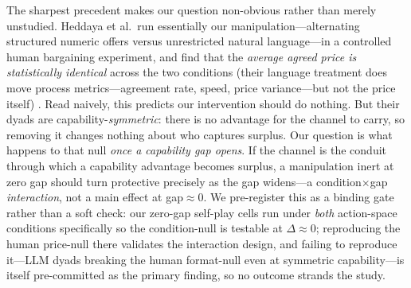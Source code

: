 \documentclass[conference]{IEEEtran}
\begin{document}
The sharpest precedent makes our question non-obvious rather than merely unstudied. Heddaya et al.\ run essentially our manipulation---alternating structured numeric offers versus unrestricted natural language---in a controlled human bargaining experiment, and find that the \emph{average agreed price is statistically identical} across the two conditions (their language treatment does move process metrics---agreement rate, speed, price variance---but not the price itself) \cite{LanguageOfBargaining2023}. Read naively, this predicts our intervention should do nothing. But their dyads are capability-\emph{symmetric}: there is no advantage for the channel to carry, so removing it changes nothing about who captures surplus. Our question is what happens to that null \emph{once a capability gap opens}. If the channel is the conduit through which a capability advantage becomes surplus, a manipulation inert at zero gap should turn protective precisely as the gap widens---a condition$\times$gap \emph{interaction}, not a main effect at gap${\approx}0$. We pre-register this as a binding gate rather than a soft check: our zero-gap self-play cells run under \emph{both} action-space conditions specifically so the condition-null is testable at $\Delta{\approx}0$; reproducing the human price-null there validates the interaction design, and failing to reproduce it---LLM dyads breaking the human format-null even at symmetric capability---is itself pre-committed as the primary finding, so no outcome strands the study.
\end{document}
